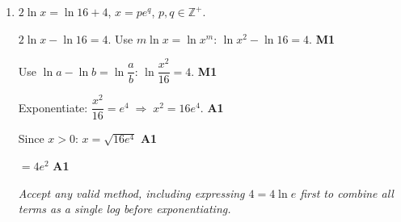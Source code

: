 \documentclass[12pt, twoside]{article}
\begin{document}
\begin{enumerate}[itemsep=0.3cm]
$= -\dfrac{2}{3}$. \hfill \textbf{A1}

\medskip

\textbf{(b)} Change of base:
$\log_{1000} b = \dfrac{\log_{10} b}{\log_{10} 1000} = \dfrac{\log_{10} b}{3}$.
\hfill \textbf{A1}

$= \dfrac{2/3}{3}$ \hfill \textbf{A1}

$= \dfrac{2}{9}$. \hfill \textbf{A1}

\medskip

\item[4.] [Maximum mark: 5]

$2\ln x = \ln 16 + 4$, $x = p e^{q}$, $p, q \in \mathbb{Z}^{+}$.

\medskip

$2\ln x - \ln 16 = 4$. \;Use $m\ln x = \ln x^{m}$:
$\ln x^{2} - \ln 16 = 4$. \hfill \textbf{M1}

Use $\ln a - \ln b = \ln\dfrac{a}{b}$:
$\ln\dfrac{x^{2}}{16} = 4$. \hfill \textbf{M1}

Exponentiate:
$\dfrac{x^{2}}{16} = e^{4} \;\Rightarrow\; x^{2} = 16 e^{4}$.
\hfill \textbf{A1}

Since $x > 0$: $x = \sqrt{16 e^{4}}$ \hfill \textbf{A1}

$ = 4 e^{2}$ \hfill \textbf{A1}

\emph{Accept any valid method, including expressing $4 = 4\ln e$ first
to combine all terms as a single log before exponentiating.}

\end{enumerate}
\end{document}
